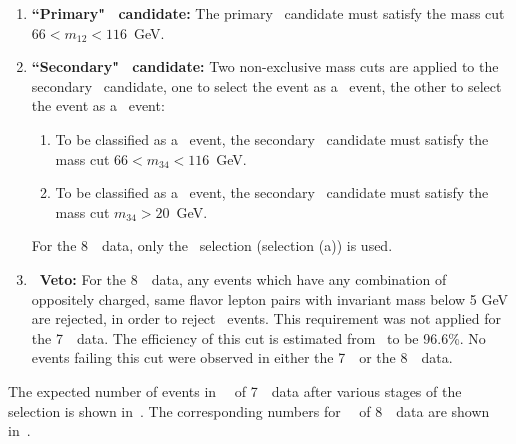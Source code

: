 \begin{enumerate}
    \item {\bf ``Primary" \Z\ candidate:} The primary \Z\ candidate must satisfy the mass cut $66<m_{12}<116$~GeV.

    \item {\bf ``Secondary" \Z\ candidate:} Two non-exclusive mass cuts are
    applied to the secondary \Z\ candidate, one
    to select the event as a \ZZ\ event, the other to select the event as a
    \ZZs\ event:
      \begin{enumerate}
     \item To be classified as a \ZZ\ event, the secondary \Z\ candidate must satisfy
     the mass cut $66<m_{34}<116$~GeV.
     \item To be classified as a \ZZs\ event, the secondary \Z\ candidate
     must satisfy the mass cut $m_{34}>20$~GeV.
    \end{enumerate}
    For the 8~\tev\ data, only the \ZZ\ selection (selection (a)) is used.

    \item {\bf \JPsi\ Veto:} For the 8~\tev\ data, any events which have any
    combination of oppositely charged, same flavor lepton pairs with invariant
    mass below 5 GeV are rejected, in order to reject \JPsi\ events. This
    requirement was not applied for the 7~\tev\ data. The efficiency of this cut
    is estimated from \mc\ to be 96.6\%. No events failing this cut were
    observed in either the 7~\tev\ or the 8~\tev\ data.

\end{enumerate}


The expected number of events in
\LumiPassGRLTwentyEleven\ \ifb\ of 7~\tev\ data after various stages of the
selection is shown in~. The corresponding numbers for
\LumiPassGRLTwentyTwelve\ \ifb\ of 8~\tev\ data are shown
in~.

